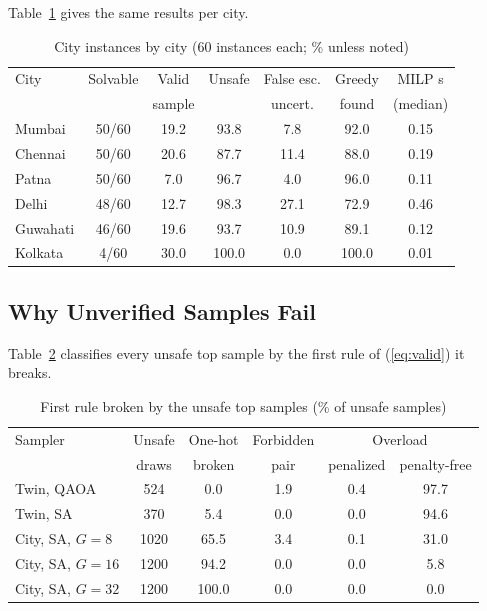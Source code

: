 \documentclass[conference]{IEEEtran}
\begin{document}
Table~\ref{tab:bycity} gives the same results per city. \ByCityText{}

\begin{table}[t]
\caption{City instances by city (60 instances each; \% unless noted)}
\label{tab:bycity}
\centering
\footnotesize
\setlength{\tabcolsep}{2.4pt}
\begin{tabular}{lcccccc}
\toprule
City & Solvable & Valid & Unsafe & False esc. & Greedy & MILP s\\
 & & sample & & uncert. & found & (median)\\
\midrule
Mumbai & 50/60 & 19.2 & 93.8 & 7.8 & 92.0 & 0.15\\
Chennai & 50/60 & 20.6 & 87.7 & 11.4 & 88.0 & 0.19\\
Patna & 50/60 & 7.0 & 96.7 & 4.0 & 96.0 & 0.11\\
Delhi & 48/60 & 12.7 & 98.3 & 27.1 & 72.9 & 0.46\\
Guwahati & 46/60 & 19.6 & 93.7 & 10.9 & 89.1 & 0.12\\
Kolkata & 4/60 & 30.0 & 100.0 & 0.0 & 100.0 & 0.01\\
\bottomrule
\end{tabular}
\end{table}

\subsection{Why Unverified Samples Fail}
\label{sec:viol}
Table~\ref{tab:viol} classifies every unsafe top sample by the first rule of (\ref{eq:valid}) it breaks. \ViolText{}

\begin{table}[t]
\caption{First rule broken by the unsafe top samples (\% of unsafe samples)}
\label{tab:viol}
\centering
\footnotesize
\setlength{\tabcolsep}{2.6pt}
\begin{tabular}{lccccc}
\toprule
Sampler & Unsafe & One-hot & Forbidden & \multicolumn{2}{c}{Overload}\\
 & draws & broken & pair & penalized & penalty-free\\
\midrule
Twin, QAOA & 524 & 0.0 & 1.9 & 0.4 & 97.7\\
Twin, SA & 370 & 5.4 & 0.0 & 0.0 & 94.6\\
City, SA, $G=8$ & 1020 & 65.5 & 3.4 & 0.1 & 31.0\\
City, SA, $G=16$ & 1200 & 94.2 & 0.0 & 0.0 & 5.8\\
City, SA, $G=32$ & 1200 & 100.0 & 0.0 & 0.0 & 0.0\\
\bottomrule
\end{tabular}
\end{table}
\end{document}
